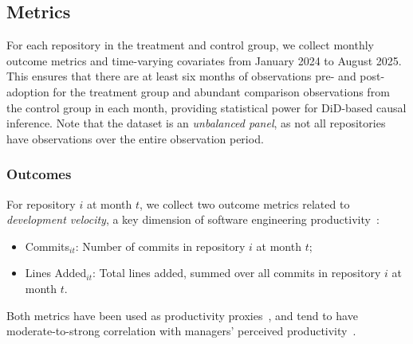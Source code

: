 \subsection{Metrics}
\label{sec:metrics}

For each repository in the treatment and control group, we collect monthly outcome metrics and time-varying covariates from January 2024 to August 2025.
This ensures that there are at least six months of observations pre- and post-adoption for the treatment group and abundant comparison observations from the control group in each month, providing statistical power for DiD-based causal inference.
Note that the dataset is an \emph{unbalanced panel}, as not all repositories have observations over the entire observation period.

\subsubsection{Outcomes}
\label{sec:outcome-metrics}

For repository $i$ at month $t$, we collect two outcome metrics related to \textit{development velocity}, a key dimension of software engineering productivity~\cite{DBLP:journals/tse/Murphy-HillJSSP21, DBLP:conf/sigsoft/ChengMCJGKZ022}:
\begin{itemize}[leftmargin=15pt]
    \item Commits$_{it}$: Number of commits in repository $i$ at month $t$;
    \item Lines Added$_{it}$: Total lines added, summed over all commits in repository $i$ at month $t$.
\end{itemize}
Both metrics have been used as productivity proxies~\cite{DBLP:journals/tosem/MockusFH02, DBLP:journals/jss/Lawrence81, DBLP:journals/ese/ScholtesMS16}, and tend to have moderate-to-strong correlation with managers' perceived productivity~\cite{DBLP:journals/ese/OliveiraFSCCG20}.


